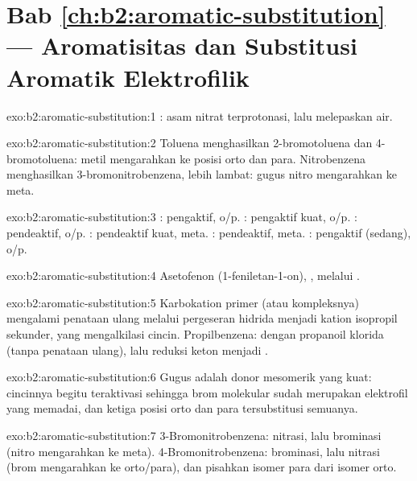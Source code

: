 \section*{Bab \ref{ch:b2:aromatic-substitution} --- Aromatisitas dan Substitusi Aromatik Elektrofilik}

\begin{solution}{exo:b2:aromatic-substitution:1}
: asam nitrat terprotonasi, lalu melepaskan air.
\end{solution}

\begin{solution}{exo:b2:aromatic-substitution:2}
Toluena menghasilkan 2-bromotoluena dan 4-bromotoluena: metil mengarahkan ke
posisi orto dan para. Nitrobenzena menghasilkan 3-bromonitrobenzena, lebih
lambat: gugus nitro mengarahkan ke meta.
\end{solution}

\begin{solution}{exo:b2:aromatic-substitution:3}
: pengaktif, o/p. : pengaktif kuat, o/p. : pendeaktif, o/p.
: pendeaktif kuat, meta. : pendeaktif, meta. :
pengaktif (sedang), o/p.
\end{solution}

\begin{solution}{exo:b2:aromatic-substitution:4}
Asetofenon (1-feniletan-1-on), , melalui  .
\end{solution}

\begin{solution}{exo:b2:aromatic-substitution:5}
Karbokation primer (atau kompleksnya) mengalami penataan ulang melalui
pergeseran hidrida menjadi kation isopropil sekunder, yang mengalkilasi
cincin. Propilbenzena:  dengan propanoil klorida
(tanpa penataan ulang), lalu reduksi  keton menjadi .
\end{solution}

\begin{solution}{exo:b2:aromatic-substitution:6}
Gugus  adalah donor mesomerik yang kuat: cincinnya begitu teraktivasi
sehingga brom molekular sudah merupakan elektrofil yang memadai, dan ketiga
posisi orto dan para tersubstitusi semuanya.
\end{solution}

\begin{solution}{exo:b2:aromatic-substitution:7}
3-Bromonitrobenzena: nitrasi, lalu brominasi (nitro mengarahkan ke meta).
4-Bromonitrobenzena: brominasi, lalu nitrasi (brom mengarahkan ke
orto/para), dan pisahkan isomer para dari isomer orto.
\end{solution}

